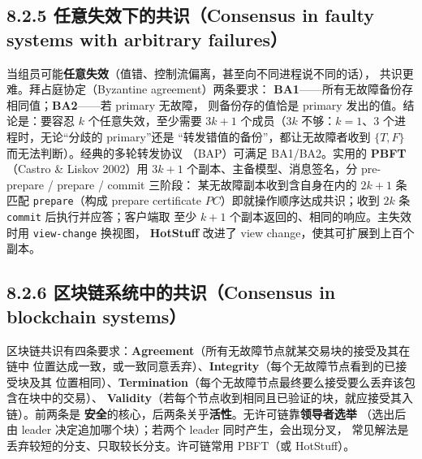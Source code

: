 \subsection*{8.2.5 任意失效下的共识（Consensus in faulty systems with arbitrary failures）}
当组员可能\textbf{任意失效}（值错、控制流偏离，甚至向不同进程说不同的话），
共识更难。拜占庭协定（Byzantine agreement）两条要求：
\textbf{BA1}——所有无故障备份存相同值；\textbf{BA2}——若 primary 无故障，
则备份存的值恰是 primary 发出的值。结论是：要容忍 $k$ 个任意失效，至少需要
$3k+1$ 个成员（$3k$ 不够：$k=1$、3 个进程时，无论“分歧的 primary”还是
“转发错值的备份”，都让无故障者收到 $\{T, F\}$ 而无法判断）。经典的多轮转发协议
（BAP）可满足 BA1/BA2。实用的 \textbf{PBFT}（Castro \& Liskov 2002）用 $3k+1$
个副本、主备模型、消息签名，分 pre-prepare / prepare / commit 三阶段：
某无故障副本收到含自身在内的 $2k+1$ 条匹配 \texttt{prepare}（构成 prepare certificate
$PC$）即就操作顺序达成共识；收到 $2k$ 条 \texttt{commit} 后执行并应答；客户端取
至少 $k+1$ 个副本返回的、相同的响应。主失效时用 \texttt{view-change} 换视图，
\textbf{HotStuff} 改进了 view change，使其可扩展到上百个副本。

\begin{closeread}
\end{closeread}


\subsection*{8.2.6 区块链系统中的共识（Consensus in blockchain systems）}
区块链共识有四条要求：\textbf{Agreement}（所有无故障节点就某交易块的接受及其在链中
位置达成一致，或一致同意丢弃）、\textbf{Integrity}（每个无故障节点看到的已接受块及其
位置相同）、\textbf{Termination}（每个无故障节点最终要么接受要么丢弃该包含在块中的交易）、
\textbf{Validity}（若每个节点收到相同且已验证的块，就应接受其入链）。前两条是
\textbf{安全}的核心，后两条关乎\textbf{活性}。无许可链靠\textbf{领导者选举}
（选出后由 leader 决定追加哪个块）；若两个 leader 同时产生，会出现分叉，
常见解法是丢弃较短的分支、只取较长分支。许可链常用 PBFT（或 HotStuff）。

